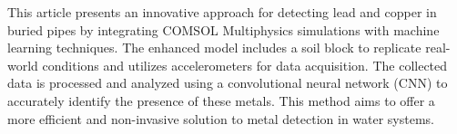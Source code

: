 This article presents an innovative approach for detecting lead and copper in buried pipes by integrating COMSOL Multiphysics simulations with machine learning techniques. The enhanced model includes a soil block to replicate real-world conditions and utilizes accelerometers for data acquisition. The collected data is processed and analyzed using a convolutional neural network (CNN) to accurately identify the presence of these metals. This method aims to offer a more efficient and non-invasive solution to metal detection in water systems.
 


